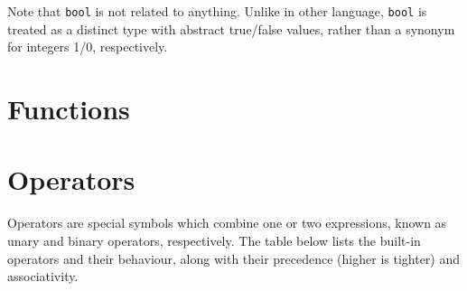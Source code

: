 \documentclass{article}
\begin{document}
    Note that \texttt{bool} is not related to anything.
    Unlike in other language, \texttt{bool} is treated as a distinct type with abstract true/false values, rather than a synonym for integers 1/0, respectively.

    \section{Functions}

    \section{Operators}

    Operators are special symbols which combine one or two expressions, known as unary and binary operators, respectively.
    The table below lists the built-in operators and their behaviour, along with their precedence (higher is tighter) and associativity.
\end{document}
